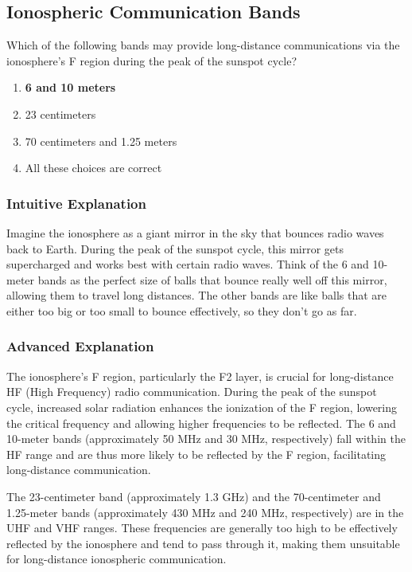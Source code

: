 \subsection{Ionospheric Communication Bands}
\label{T3C10}

\begin{tcolorbox}[colback=gray!10!white,colframe=black!75!black,title=T3C10]
Which of the following bands may provide long-distance communications via the ionosphere’s F region during the peak of the sunspot cycle?
\begin{enumerate}[label=\Alph*.]
    \item \textbf{6 and 10 meters}
    \item 23 centimeters
    \item 70 centimeters and 1.25 meters
    \item All these choices are correct
\end{enumerate}
\end{tcolorbox}

\subsubsection{Intuitive Explanation}
Imagine the ionosphere as a giant mirror in the sky that bounces radio waves back to Earth. During the peak of the sunspot cycle, this mirror gets supercharged and works best with certain radio waves. Think of the 6 and 10-meter bands as the perfect size of balls that bounce really well off this mirror, allowing them to travel long distances. The other bands are like balls that are either too big or too small to bounce effectively, so they don’t go as far.

\subsubsection{Advanced Explanation}
The ionosphere’s F region, particularly the F2 layer, is crucial for long-distance HF (High Frequency) radio communication. During the peak of the sunspot cycle, increased solar radiation enhances the ionization of the F region, lowering the critical frequency and allowing higher frequencies to be reflected. The 6 and 10-meter bands (approximately 50 MHz and 30 MHz, respectively) fall within the HF range and are thus more likely to be reflected by the F region, facilitating long-distance communication. 

The 23-centimeter band (approximately 1.3 GHz) and the 70-centimeter and 1.25-meter bands (approximately 430 MHz and 240 MHz, respectively) are in the UHF and VHF ranges. These frequencies are generally too high to be effectively reflected by the ionosphere and tend to pass through it, making them unsuitable for long-distance ionospheric communication.

